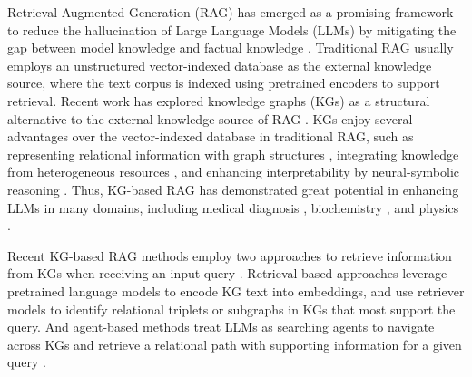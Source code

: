 
Retrieval-Augmented Generation (RAG) \cite{lewis2020retrieval} has emerged as a promising framework to reduce the hallucination of Large Language Models (LLMs) by mitigating the gap between model knowledge and factual knowledge \cite{kaddour2023challenges,zhang2023siren,huang2025survey}.
Traditional RAG usually employs an unstructured vector-indexed database as the external knowledge source, where the text corpus is indexed using pretrained encoders to support retrieval.
Recent work has explored knowledge graphs (KGs) \cite{sunthink} as a structural alternative to the external knowledge source of RAG \cite{pan2024unifying}.
KGs enjoy several advantages over the vector-indexed database in traditional RAG, 
such as representing relational information with graph structures \cite{zhang2024knowgpt}, 
integrating knowledge from heterogeneous resources \cite{pan2024unifying},
and enhancing interpretability by neural-symbolic reasoning \cite{zhang2021neural}.
Thus, KG-based RAG has demonstrated great potential in enhancing LLMs in many domains, including medical diagnosis \cite{suknowledge}, biochemistry \cite{yang2025multi}, and physics \cite{wan2025deepresearch}.

Recent KG-based RAG methods employ two approaches to retrieve information from KGs when receiving an input query \cite{luoreasoning,han2025rag,luo2025gfm}.
Retrieval-based approaches \cite{he2024g,liretrieval,yasunaga2021qa} leverage pretrained language models \cite{reimers2019sentence} to encode KG text into embeddings, and use retriever models \cite{kipf2017semi} to identify relational triplets or subgraphs in KGs that most support the query.
And agent-based methods treat LLMs as searching agents to navigate across KGs and retrieve a relational path with supporting information for a given query \cite{sunthink,luoreasoning,ma2024think}.

